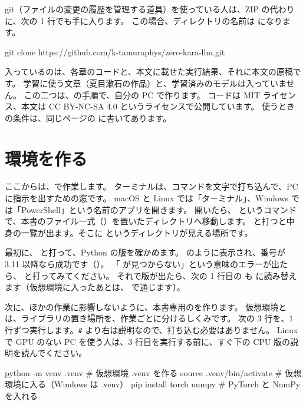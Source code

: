 git（ファイルの変更の履歴を管理する道具）を使っている人は、ZIP の代わりに、次の 1 行でも手に入ります。
この場合、ディレクトリの名前は  になります。

\begin{textcode}
git clone https://github.com/k-tamuraphys/zero-kara-llm.git
\end{textcode}

入っているのは、各章のコードと、本文に載せた実行結果、それに本文の原稿です。
学習に使う文章（夏目漱石の作品）と、学習済みのモデルは入っていません。
この二つは、の手順で、自分の PC で作ります。
コードは MIT ライセンス、本文は CC BY-NC-SA 4.0 というライセンスで公開しています。
使うときの条件は、同じページの  に書いてあります。

\section{環境を作る}\label{sec:setup-install}

ここからは、で作業します。
ターミナルは、コマンドを文字で打ち込んで、PC に指示を出すための窓です。
macOS と Linux では「ターミナル」、Windows では「PowerShell」という名前のアプリを開きます。
開いたら、 というコマンドで、本書のファイル一式（）を置いたディレクトリへ移動します。
 と打つと中身の一覧が出ます。そこに  というディレクトリが見える場所です。

最初に、 と打って、Python の版を確かめます。
 のように表示され、番号が 3.11 以降なら成功です（）。
「 が見つからない」という意味のエラーが出たら、 と打ってみてください。
それで版が出たら、次の 1 行目の  も  に読み替えます（仮想環境に入ったあとは、 で通じます）。

次に、ほかの作業に影響しないように、本書専用のを作ります。
仮想環境とは、ライブラリの置き場所を、作業ごとに分けるしくみです。
次の 3 行を、1 行ずつ実行します。\texttt{\#} より右は説明なので、打ち込む必要はありません。
Linux で GPU のない PC を使う人は、3 行目を実行する前に、すぐ下の CPU 版の説明を読んでください。

\begin{textcode}
python -m venv .venv              # 仮想環境 .venv を作る
source .venv/bin/activate         # 仮想環境に入る（Windows は .venv\Scripts\activate）
pip install torch numpy           # PyTorch と NumPy を入れる
\end{textcode}

